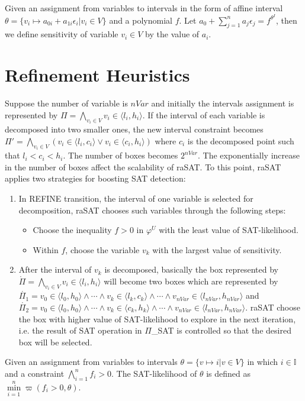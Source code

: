 \begin{definition}
Given an assignment from variables to intervals in the form of affine interval $\theta = \{v_i \mapsto a_{0i} + a_{1i}\epsilon_i | v_i \in V\}$ and a polynomial $f$. Let $a_0 + \sum\limits_{j = 1}^n a_j\epsilon_j = f^{\theta^I}$, then we define sensitivity of variable $v_i \in V$ by the value of $a_i$.
\end{definition}

\section{Refinement Heuristics} \label{sec:SATheuristics}
Suppose the number of variable is $nVar$ and initially the intervals assignment is represented by $\Pi = \bigwedge\limits_{v_i \in V} v_i \in \langle l_i, h_i \rangle$. If the interval of each variable is decomposed into two smaller ones, the new interval constraint becomes $\Pi' = \bigwedge\limits_{v_i \in V} (v_i \in \langle l_i, c_i \rangle \vee v_i \in \langle c_i, h_i \rangle)$ where $c_i$ is the decomposed point such that $l_i < c_i < h_i$. The number of boxes becomes $2^{nVar}$. The exponentially increase in the number of boxes affect the scalability of raSAT. To this point, raSAT applies two strategies for boosting SAT detection:
\begin{enumerate}
\item In \tiny{REFINE} \normalsize transition, the interval of one variable is selected for decomposition, raSAT chooses such variables through the following steps:
\begin{itemize}
\item Choose the inequality $f > 0$ in $\varphi^U$ with the least value of SAT-likelihood.
\item Within $f$, choose the variable $v_k$ with the largest value of sensitivity.
\end{itemize}
\item \sloppy After the interval of $v_k$ is decomposed, basically the box represented by ${\mathring{\Pi} = \bigwedge\limits_{v_i \in V} v_i \in \langle l_i, h_i \rangle}$ will become two boxes which are represented by ${\mathring{\Pi_1} = v_0 \in \langle l_0, h_0 \rangle \wedge \cdots \wedge v_k \in \langle l_k, c_k \rangle \wedge \cdots \wedge v_{nVar} \in \langle l_{nVar}, h_{nVar} \rangle}$ and ${\mathring{\Pi_2} = v_0 \in \langle l_0, h_0 \rangle \wedge \cdots \wedge v_k \in \langle c_k, h_k \rangle \wedge \cdots \wedge v_{nVar} \in \langle l_{nVar}, h_{nVar} \rangle}$. raSAT choose the box with higher value of SAT-likelihood to explore in the next iteration, i.e. the result of SAT operation in \tiny $\Pi$\_SAT \normalsize is controlled so that the desired box will be selected.
\end{enumerate}
\begin{definition}
Given an assignment from variables to intervals $\theta = \{v \mapsto i | v \in V\}$ in which $i \in \mathbb{I}$ and a constraint $\bigwedge\limits_{i = 1}^nf_i > 0$. The SAT-likelihood of $\theta$ is defined as ${\min\limits_{i = 1}^n \varpi(f_i > 0, \theta)}$.
\end{definition}